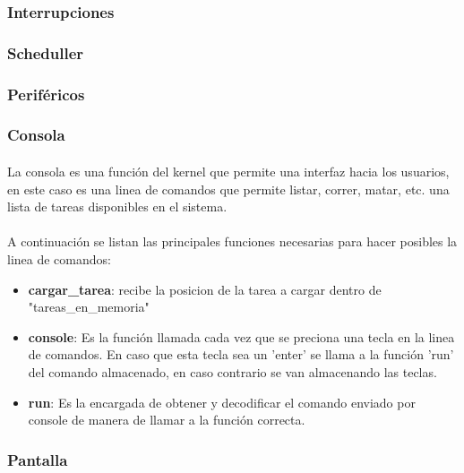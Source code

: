 \documentclass[11pt, a4paper]{article}
\begin{document}
		\subsubsection{Interrupciones}
		\subsubsection{Scheduller}
		\subsubsection{Periféricos}
		\subsubsection{Consola}
			\paragraph{}
				La consola es una función del kernel que permite una interfaz hacia los usuarios, en este caso es una linea de comandos que permite listar, correr, matar, etc. una lista de tareas disponibles en el sistema. 
			\paragraph{}
				A continuación se listan las principales funciones necesarias para hacer posibles la linea de comandos:
				\begin{itemize}

                    \item \textbf{ cargar\_tarea}: recibe la posicion de la tarea a cargar dentro de "tareas\_en\_memoria"

                    \item \textbf{console}: Es la función llamada cada vez que se preciona una tecla en la linea de comandos. En caso que esta tecla sea un 'enter' se llama a la función 'run' del comando almacenado, en caso contrario se van almacenando las teclas.
                    \item \textbf{run}: Es la encargada de obtener y decodificar el comando enviado por console de manera de llamar a la función correcta.
			
				
				
				\end{itemize}				
	


		
     	\subsubsection{Pantalla}
\end{document}

